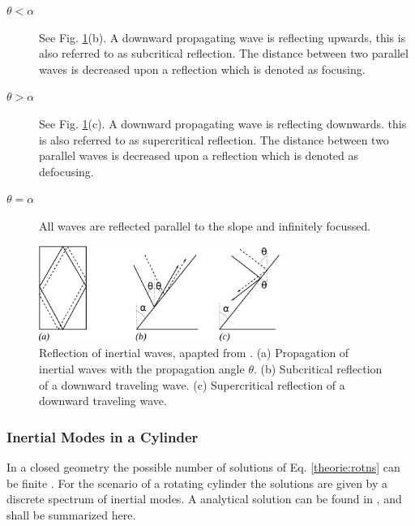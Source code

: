 \begin{description}
    \item[$\theta < \alpha$] See Fig. \ref{theorie:reflection_img}(b). A downward propagating wave is reflecting upwards,
                             this is also referred to as subcritical reflection.
                             The distance between two parallel waves is decreased upon a reflection which is denoted as focusing.
    \item[$\theta > \alpha$] See Fig. \ref{theorie:reflection_img}(c). A downward propagating wave is reflecting downwards.
                             this is also referred to as supercritical reflection.
                             The distance between two parallel waves is decreased upon a reflection which is denoted as defocusing.
    \item[$\theta = \alpha$] All waves are reflected parallel to the slope and infinitely focussed.
\end{description}

\begin{figure}[!bp]
      \centering
        \includegraphics[width=0.7\textwidth]{gfx/theorie/reflection.pdf}
       \caption{Reflection of inertial waves, apapted from \citep{Clausen2011}.
        (a) Propagation of inertial waves with the propagation angle $\theta$.
        (b) Subcritical reflection of a downward traveling wave.
        (c) Supercritical reflection of a downward traveling wave.
       }
       \label{theorie:reflection_img}
\end{figure}

\clearpage


\subsubsection{Inertial Modes in a Cylinder}
\label{theorie:rotating:cyl_modes}

In a closed geometry the possible number of solutions of Eq. \ref{theorie:rotns} can be finite \citep{Clausen2011}.
For the scenario of a rotating cylinder the solutions are given by a discrete spectrum of  inertial modes.
A analytical solution can be found in \citep{Greenspan1990}, and shall be summarized here.

